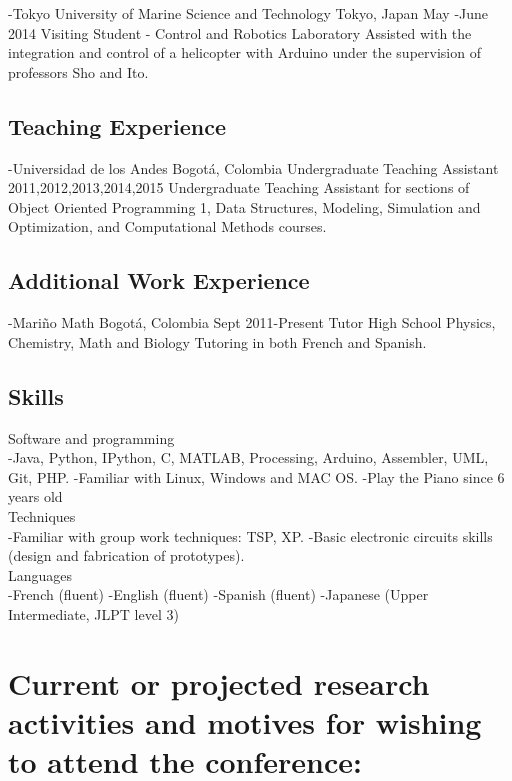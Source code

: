 \documentclass[12pt]{article}
\begin{document}
-Tokyo University of Marine Science and Technology	Tokyo, Japan
May -June 2014	Visiting Student - Control and Robotics Laboratory
Assisted with the integration and control of a helicopter with Arduino under the supervision of professors Sho and Ito. 

\subsection{Teaching Experience	}
-Universidad de los Andes		Bogotá, Colombia
Undergraduate Teaching Assistant	2011,2012,2013,2014,2015	
Undergraduate Teaching Assistant for sections of Object Oriented Programming 1, Data Structures, Modeling, Simulation and Optimization, and Computational Methods courses.
	
\subsection{Additional Work Experience}
-Mariño Math		Bogotá, Colombia
Sept 2011-Present	Tutor
High School Physics, Chemistry, Math and Biology Tutoring in both French and Spanish.

\subsection{Skills}
Software and programming\\
-Java, Python, IPython, C, MATLAB, Processing, Arduino, Assembler, UML, Git, PHP.
-Familiar with Linux, Windows and MAC OS.
-Play the Piano since 6 years old\\

Techniques\\
-Familiar with group work techniques: TSP, XP.
-Basic electronic circuits skills (design and fabrication of prototypes).\\

Languages\\
-French (fluent) 
-English (fluent)
-Spanish (fluent)				   	     
-Japanese (Upper Intermediate, JLPT level 3)

\section{Current or projected research activities and motives for wishing to attend the conference:}
\end{document}
